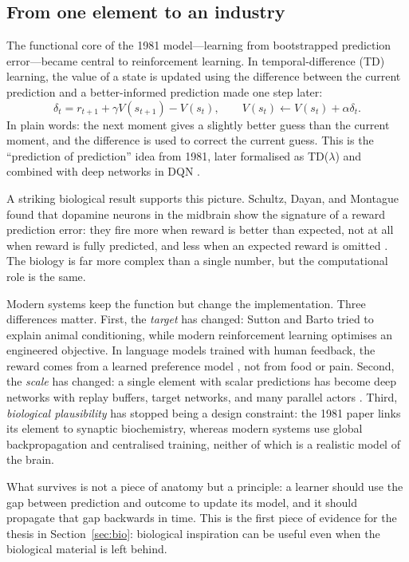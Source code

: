 \documentclass{article}
\begin{document}
\subsection{From one element to an industry}

The functional core of the 1981 model---learning from bootstrapped prediction
error---became central to reinforcement learning. In temporal-difference (TD) learning,
the value of a state is updated using the difference between the current prediction and a
better-informed prediction made one step later:
\begin{equation}\label{eq:td}
  \delta_t = r_{t+1} + \gamma V(s_{t+1}) - V(s_t), \qquad
  V(s_t) \leftarrow V(s_t) + \alpha \delta_t .
\end{equation}
In plain words: the next moment gives a slightly better guess than the current moment, and
the difference is used to correct the current guess. This is the ``prediction of
prediction'' idea from 1981, later formalised as TD($\lambda$)
\citep{sutton1988learning} and combined with deep networks in DQN \citep{mnih2015human}.

A striking biological result supports this picture. Schultz, Dayan, and Montague found
that dopamine neurons in the midbrain show the signature of a reward prediction error:
they fire more when reward is better than expected, not at all when reward is fully
predicted, and less when an expected reward is omitted \citep{schultz1997neural}. The
biology is far more complex than a single number, but the computational role is the same.

Modern systems keep the function but change the implementation. Three differences matter.
First, the \emph{target} has changed: Sutton and Barto tried to explain animal
conditioning, while modern reinforcement learning optimises an engineered objective. In
language models trained with human feedback, the reward comes from a learned preference
model \citep{ouyang2022training}, not from food or pain. Second, the \emph{scale} has
changed: a single element with scalar predictions has become deep networks with replay
buffers, target networks, and many parallel actors \citep{mnih2015human}. Third,
\emph{biological plausibility} has stopped being a design constraint: the 1981 paper links
its element to synaptic biochemistry, whereas modern systems use global backpropagation
and centralised training, neither of which is a realistic model of the brain.

What survives is not a piece of anatomy but a principle: a learner should use the gap
between prediction and outcome to update its model, and it should propagate that gap
backwards in time. This is the first piece of evidence for the thesis in
Section~\ref{sec:bio}: biological inspiration can be useful even when the biological
material is left behind.
\end{document}
